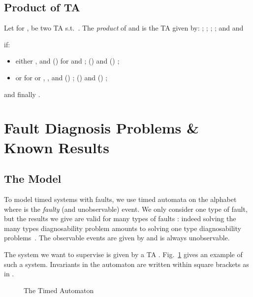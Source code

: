 \documentclass[letterpaper,10pt,conference]{ieeeconf}  \IEEEoverridecommandlockouts                              \overrideIEEEmargins
\def\st{{s.t.}~}
\def\endef{\ifmmode\squareforged\else{\unskip\nobreak\hfil
\penalty50\hskip1em\null\nobreak\hfil
\parfillskip=0pt\finalhyphendemerits=0\endgraf}\fi}
\begin{document}
\subsection{Product of TA}
\begin{definition} \label{def-prod-sync} Let
    for ,
  be two TA \st .  The \emph{product} of
   and  is the TA   given by:
;
;
;
; and
 and
    
    if:
    \begin{itemize}
    \item either , and ()  for  and ; ()  and
      () ;
    \item or for  or , , and ()
      ; () 
      and () ;
\end{itemize}
and finally .
     \endef
\end{definition}





\section{Fault Diagnosis Problems \& Known Results}\label{sec-fd}

\subsection{The Model}
To model timed systems with faults, we use timed automata on the
alphabet  where  is
the \emph{faulty} (and unobservable) event. We only consider one type
of fault, but the results we give are valid for many types of
faults : indeed solving the many types
diagnosability problem amounts to solving  one type diagnosability
problems~\cite{yoo-lafortune-tac-02}.
The observable events are given by  and
 is always unobservable.

The system we want to supervise is given by a TA
. Fig.~\ref{fig-ex-diag1}
gives an example of such a system.  Invariants in the automaton 
 are written within square brackets as in .
\begin{figure}[hbtp]
  \centering
\caption{The Timed Automaton }
\label{fig-ex-diag1}
\end{figure}
\end{document}
